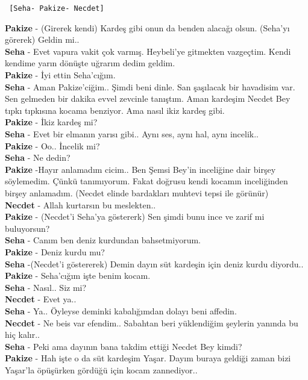 \documentclass[]{book}
\begin{document}
\begin{verbatim}
 [Seha- Pakize- Necdet]
\end{verbatim}

\textbf{Pakize} - (Girerek kendi) Kardeş gibi onun da benden alacağı olsun. (Seha'yı görerek) Geldin mi..\\
\textbf{Seha} - Evet vapura vakit çok varmış. Heybeli'ye gitmekten vazgeçtim. Kendi kendime yarın dönüşte uğrarım dedim geldim.\\
\textbf{Pakize} - İyi ettin Seha'cığım.\\
\textbf{Seha} - Aman Pakize'ciğim.. Şimdi beni dinle. San şaşılacak bir havadisim var. Sen gelmeden bir dakika evvel zevcinle tanıştım. Aman kardeşim Necdet Bey tıpkı tıpkısına kocama benziyor. Ama nasıl ikiz kardeş gibi.\\
\textbf{Pakize} - İkiz kardeş mi?\\
\textbf{Seha} - Evet bir elmanın yarısı gibi.. Aynı ses, aynı hal, aynı incelik..\\
\textbf{Pakize} - Oo.. İncelik mi?\\
\textbf{Seha} - Ne dedin?\\
\textbf{Pakize} -Hayır anlamadım cicim.. Ben Şemsi Bey'in inceliğine dair birşey söylemedim. Çünkü tanımıyorum. Fakat doğrusu kendi kocamın inceliğinden birşey anlamadım. (Necdet elinde bardakları muhtevi tepsi ile görünür)\\
\textbf{Necdet} - Allah kurtarsın bu meslekten..\\
\textbf{Pakize} - (Necdet'i Seha'ya göstererk) Sen şimdi bunu ince ve zarif mi buluyorsun?\\
\textbf{Seha} - Canım ben deniz kurdundan bahsetmiyorum.\\
\textbf{Pakize} - Deniz kurdu mu?\\
\textbf{Seha} -(Necdet'i göstererek) Demin dayın süt kardeşin için deniz kurdu diyordu..\\
\textbf{Pakize} - Seha'cığım işte benim kocam.\\
\textbf{Seha} - Nasıl.. Siz mi?\\
\textbf{Necdet} - Evet ya..\\
\textbf{Seha} - Ya.. Öyleyse deminki kabalığımdan dolayı beni affedin.\\
\textbf{Necdet} - Ne beis var efendim.. Sabahtan beri yüklendiğim şeylerin yanında bu hiç kalır..\\
\textbf{Seha} - Peki ama dayının bana takdim ettiği Necdet Bey kimdi?\\
\textbf{Pakize} - Hah işte o da süt kardeşim Yaşar. Dayım buraya geldiği zaman bizi Yaşar'la öpüşürken gördüğü için kocam zannediyor..\\
\end{document}
